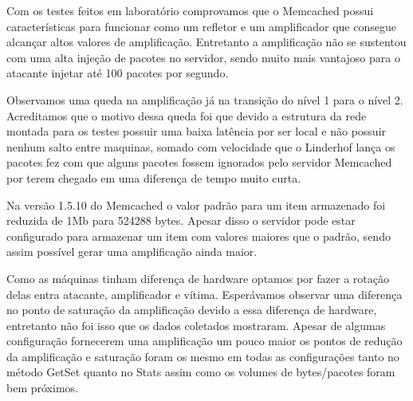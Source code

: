 Com os testes feitos em laboratório comprovamos que o Memcached possui características para funcionar como um refletor e um amplificador que consegue alcançar altos valores de amplificação. Entretanto a amplificação não se sustentou com uma alta injeção de pacotes no servidor, sendo muito mais vantajoso para o atacante injetar até 100 pacotes por segundo.

Observamos uma queda na amplificação já na transição do nível 1 para o nível 2. Acreditamos que o motivo dessa queda foi que devido a estrutura da rede montada para os testes possuir uma baixa latência por ser local e não possuir nenhum salto entre maquinas, somado com velocidade que o Linderhof lança os pacotes fez com que alguns pacotes fossem ignorados pelo servidor Memcached por terem chegado em uma diferença de tempo muito curta.

Na versão 1.5.10 do Memcached o valor padrão para um item armazenado foi reduzida de 1Mb para 524288 bytes. Apesar disso o servidor pode estar configurado para armazenar um item com valores maiores que o padrão, sendo assim possível gerar uma amplificação ainda maior.

Como as máquinas tinham diferença de hardware optamos por fazer a rotação delas entra atacante, amplificador e vítima. Esperávamos observar uma diferença no ponto de saturação da amplificação devido a essa diferença de hardware, entretanto não foi isso que os dados coletados mostraram. Apesar de algumas configuração fornecerem uma amplificação um pouco maior os pontos de redução da amplificação e saturação foram os mesmo em todas as configurações tanto no método GetSet quanto no Stats assim como os volumes de bytes/pacotes foram bem próximos.







